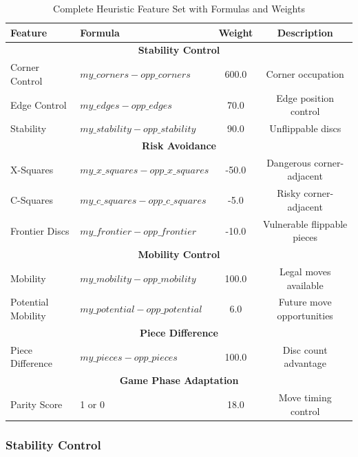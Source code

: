 \documentclass[10pt, titlepage, oneside, a4paper]{article}
\begin{document}
\begin{table}[H]
\centering
\footnotesize
\begin{tabular}{|l|l|c|c|}
\hline
\textbf{Feature} & \textbf{Formula} & \textbf{Weight} & \textbf{Description} \\
\hline
\multicolumn{4}{|c|}{\textbf{Stability Control}} \\
\hline
Corner Control & $my\_corners - opp\_corners$ & 600.0 & Corner occupation \\
\hline
Edge Control & $my\_edges - opp\_edges$ & 70.0 & Edge position control \\
\hline
Stability & $my\_stability - opp\_stability$ & 90.0 & Unflippable discs \\
\hline
\multicolumn{4}{|c|}{\textbf{Risk Avoidance}} \\
\hline
X-Squares & $my\_x\_squares - opp\_x\_squares$ & -50.0 & Dangerous corner-adjacent \\
\hline
C-Squares & $my\_c\_squares - opp\_c\_squares$ & -5.0 & Risky corner-adjacent \\
\hline
Frontier Discs & $my\_frontier - opp\_frontier$ & -10.0 & Vulnerable flippable pieces \\
\hline
\multicolumn{4}{|c|}{\textbf{Mobility Control}} \\
\hline
Mobility & $my\_mobility - opp\_mobility$ & 100.0 & Legal moves available \\
\hline
Potential Mobility & $my\_potential - opp\_potential$ & 6.0 & Future move opportunities \\
\hline
\multicolumn{4}{|c|}{\textbf{Piece Difference}} \\
\hline
Piece Difference & $my\_pieces - opp\_pieces$ & 100.0 & Disc count advantage \\
\hline
\multicolumn{4}{|c|}{\textbf{Game Phase Adaptation}} \\
\hline
Parity Score & 1 or 0 & 18.0 & Move timing control \\
\hline
\end{tabular}
\caption{Complete Heuristic Feature Set with Formulas and Weights}
\end{table}


\setcounter{secnumdepth}{4}
\subsubsection{Stability Control}

\vspace{0.5em}
\end{document}
